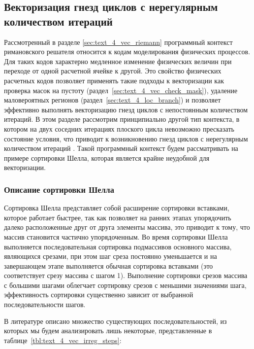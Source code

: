 \subsection{Векторизация гнезд циклов с нерегулярным \\ количеством итераций}

Рассмотренный в разделе \ref{sec:text_4_vec_riemann} программный контекст римановского решателя\label{term:riemann_solver7} относится к кодам моделирования физических процессов.
Для таких кодов характерно медленное изменение физических величин при переходе от одной расчетной ячейке к другой.
Это свойство физических расчетных кодов позволяет применять такие подходы к векторизации как проверка масок на пустоту\label{term:meth_vec_check3} (раздел~\ref{sec:text_4_vec_check_mask}), удаление маловероятных регионов\label{term:meth_vec_del_low_prob_regions2} (раздел~\ref{sec:text_4_loc_branch}) и позволяет эффективно выполнять векторизацию гнезд циклов с непостоянным количеством итераций.
В этом разделе рассмотрим принципиально другой тип контекста, в котором на двух соседних итерациях плоского цикла невозможно пресказать состояние условия, что приводит к возникновению гнезд циклов с нерегулярным количеством итераций \cite{Rybakov2019VecIrr,Rybakov2018VecNest,Shabanov2019VecSci}.
Такой программный контекст будем рассматривать на примере сортировки Шелла, которая является крайне неудобной для векторизации.

\subsubsection{Описание сортировки Шелла}

\label{term:shell_sort}Сортировка Шелла \cite{Knut1994} представляет собой расширение сортировки вставками, которое работает быстрее, так как позволяет на ранних этапах упорядочить далеко расположенные друг от друга элементы массива, это приводит к тому, что массив становится частично упорядоченным.
Во время сортировки Шелла выполняется последовательная сортировка подмассивов основного массива, являющихся срезами, при этом шаг среза постоянно уменьшается и на завершающем этапе выполняется обычная сортировка вставками (это соответствует срезу массива с шагом 1).
Выполнение сортировки срезов массива с большими шагами облегчает сортировку срезов с меньшими значениями шага, эффективность сортировки существенно зависит от выбранной последовательности шагов.

В литературе описано множество существующих последовательностей, из которых мы будем анализировать лишь некоторые, представленные в таблице~\ref{tbl:text_4_vec_irreg_steps}:

